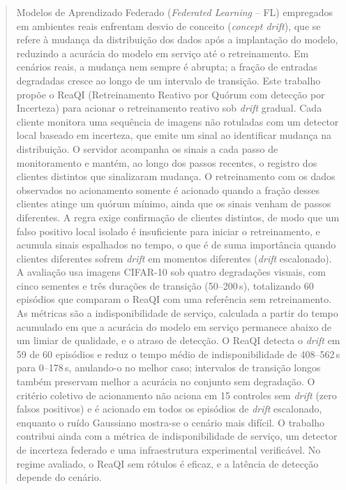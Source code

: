 \documentclass[conference]{IEEEtran}
\begin{document}
\begin{abstract}
Modelos de Aprendizado Federado (\textit{Federated Learning} -- FL) empregados em ambientes reais enfrentam desvio de conceito (\textit{concept drift}), que se refere à mudança da distribuição dos dados após a implantação do modelo, reduzindo a acurácia do modelo em serviço até o retreinamento. Em cenários reais, a mudança nem sempre é abrupta; a fração de entradas degradadas cresce ao longo de um intervalo de transição. Este trabalho propõe o ReaQI (Retreinamento Reativo por Quórum com detecção por Incerteza) para acionar o retreinamento reativo sob \textit{drift} gradual. Cada cliente monitora uma sequência de imagens não rotuladas com um detector local baseado em incerteza, que emite um sinal ao identificar mudança na distribuição. O servidor acompanha os sinais a cada passo de monitoramento e mantém, ao longo dos passos recentes, o registro dos clientes distintos que sinalizaram mudança. O retreinamento com os dados observados no acionamento somente é acionado quando a fração desses clientes atinge um quórum mínimo, ainda que os sinais venham de passos diferentes. A regra exige confirmação de clientes distintos, de modo que um falso positivo local isolado é insuficiente para iniciar o retreinamento, e acumula sinais espalhados no tempo, o que é de suma importância quando clientes diferentes sofrem \textit{drift} em momentos diferentes (\textit{drift} escalonado). A avaliação usa imagens CIFAR-10 sob quatro degradações visuais, com cinco sementes e três durações de transição (50--200\,s), totalizando 60 episódios que comparam o ReaQI com uma referência sem retreinamento. As métricas são a indisponibilidade de serviço, calculada a partir do tempo acumulado em que a acurácia do modelo em serviço permanece abaixo de um limiar de qualidade, e o atraso de detecção. O ReaQI detecta o \textit{drift} em 59 de 60 episódios e reduz o tempo médio de indisponibilidade de 408--562\,s para 0--178\,s, anulando-o no melhor caso; intervalos de transição longos também preservam melhor a acurácia no conjunto sem degradação. O critério coletivo de acionamento não aciona em 15 controles sem \textit{drift} (zero falsos positivos) e é acionado em todos os episódios de \textit{drift} escalonado, enquanto o ruído Gaussiano mostra-se o cenário mais difícil. O trabalho contribui ainda com a métrica de indisponibilidade de serviço, um detector de incerteza federado e uma infraestrutura experimental verificável. No regime avaliado, o ReaQI sem rótulos é eficaz, e a latência de detecção depende do cenário.
\end{abstract}
\end{document}
